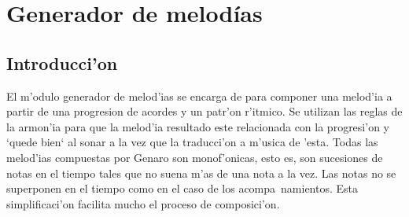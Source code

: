 ﻿\chapter{Generador de melod\'ias}
\section{Introducci'on}
El m'odulo generador de melod'ias se encarga de para componer una melod'ia a partir de una progresion de acordes y un patr'on r'itmico. Se utilizan las reglas de la armon'ia para que la melod'ia resultado este relacionada con la progresi'on y `quede bien` al sonar a la vez que la traducci'on a m'usica de 'esta.
\newline
Todas las melod'ias compuestas por Genaro son monof'onicas, esto es, son sucesiones de notas en el tiempo tales que no suena m'as de una nota a la vez. Las notas no se superponen en el tiempo como en el caso de los acompa~namientos. Esta simplificaci'on facilita mucho el proceso de composici'on.

